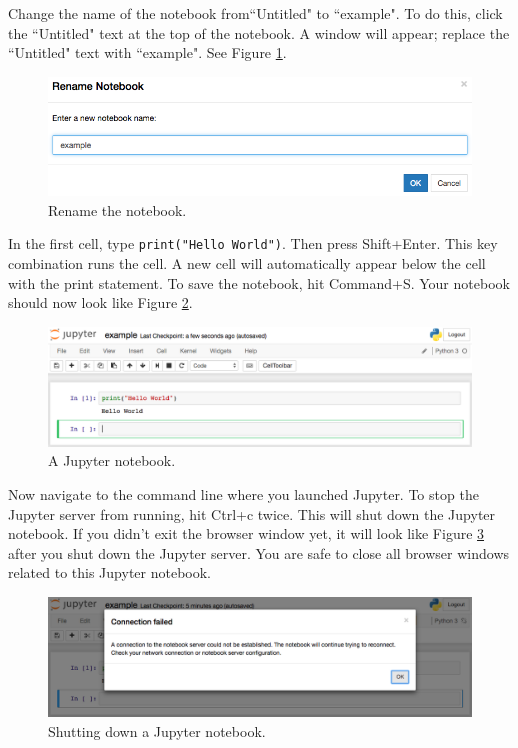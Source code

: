 \documentclass[11pt,a4paper]{article}
\begin{document}
Change the name of the notebook from``Untitled" to ``example".
To do this, click the ``Untitled" text at the top of the notebook.
A window will appear; replace the ``Untitled" text with ``example".
See Figure \ref{fig:rename-notebook}.

\begin{figure}[h]
\centering
\includegraphics[width=.7\textwidth]{figures/rename_notebook.png}
\caption{Rename the notebook.}
\label{fig:rename-notebook}
\end{figure}

In the first cell, type \texttt{print("Hello World")}.
Then press Shift+Enter.
This key combination runs the cell.
A new cell will automatically appear below the cell with the print statement.
To save the notebook, hit Command+S.
Your notebook should now look like Figure \ref{fig:example-notebook}.

\begin{figure}[h]
\centering
\includegraphics[width=.7\textwidth]{figures/example_notebook.png}
\caption{A Jupyter notebook.}
\label{fig:example-notebook}
\end{figure}

Now navigate to the command line where you launched Jupyter.
To stop the Jupyter server from running, hit Ctrl+c twice.
This will shut down the Jupyter notebook.
If you didn't exit the browser window yet, it will look like Figure \ref{fig:jupyter-shutdown} after you shut down the Jupyter server.
You are safe to close all browser windows related to this Jupyter notebook.

\begin{figure}[h]
\centering
\includegraphics[width=.7\textwidth]{figures/jupyter_shutdown.png}
\caption{Shutting down a Jupyter notebook.}
\label{fig:jupyter-shutdown}
\end{figure}
\end{document}
